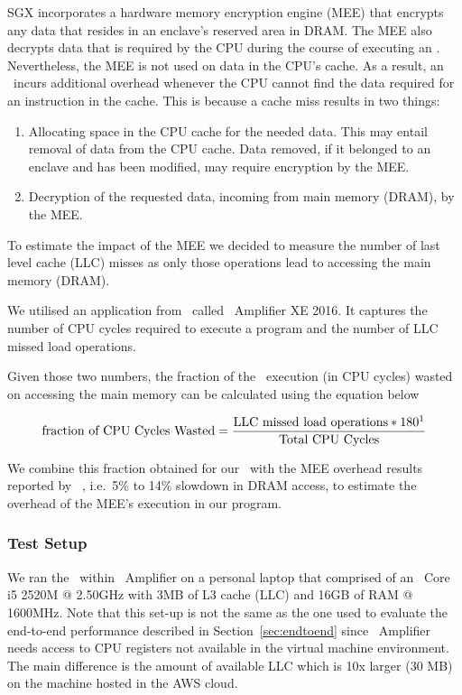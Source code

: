 \documentclass[../../../main.tex]{subfiles}
\begin{document}
\label{sec:mem-analysis}
SGX incorporates a hardware memory encryption engine (MEE) that encrypts any
data that resides in an enclave's reserved area in DRAM. The MEE also decrypts
data that is required by the CPU during the course of executing an
\enclaveprogram. Nevertheless, the MEE is not used on data in the CPU's cache.
As a result, an \enclaveprogram~incurs additional overhead whenever the CPU
cannot find the data required for an instruction in the cache. This is because
a cache miss results in two things:
\begin{enumerate}
  \item Allocating space in the CPU cache for the needed data. This may entail
    removal of data from the CPU cache. Data removed, if it belonged to an
    enclave and has been modified, may require encryption by the MEE.
  \item Decryption of the requested data, incoming from main memory (DRAM), by
    the MEE.
\end{enumerate}

To estimate the impact of the MEE we decided to measure the number of last
level cache (LLC) misses as only those operations lead to accessing the main
memory (DRAM).

We utilised an application from \Intel~called \VTune~Amplifier XE 2016. It
captures the number of CPU cycles required to execute a program and the number
of LLC missed load operations. 

Given those two numbers, the fraction of the \enclaveprogram~execution (in CPU
cycles) wasted on accessing the main memory can be calculated using the
equation below~\cite{intel-eqn}

\begin{align*}
 \text{fraction of CPU Cycles Wasted} = 
    \frac{\text{LLC missed load operations} * 180\footnotemark}
      {\text{Total CPU Cycles}}
\end{align*}


We combine this fraction obtained for our \busywait~with the MEE overhead
results reported by \Intel~\cite{cryptoeprint:2016:204}, i.e.\ 5\% to 14\%
slowdown in DRAM access, to estimate the overhead of the MEE's execution in
our program.

\subsubsection*{Test Setup}
We ran the \enclavemodel~within \VTune~Amplifier on a personal laptop that
comprised of an \Intel~Core i5 2520M @ 2.50GHz with 3MB of L3 cache (LLC) and
16GB of RAM @ 1600MHz. Note that this set-up is not the same as the one used to
evaluate the end-to-end performance described in Section~\ref{sec:endtoend}
since \VTune~Amplifier needs access to CPU registers not available in the
virtual machine environment. The main difference is the amount of available
LLC which is 10x larger (30 MB) on the machine hosted in the AWS cloud.
\end{document}
